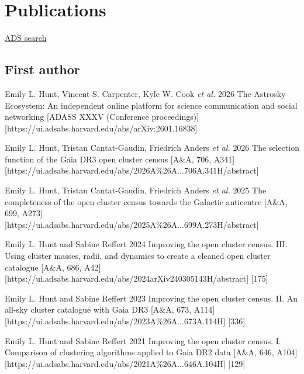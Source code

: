 \section*{Publications}

\href{\cvADSLink}{ADS search \faLink}%


\subsection*{First author}

\begin{etaremune}
    \item \publication
        {Emily L. Hunt, Vincent S. Carpenter, Kyle W. Cook \emph{et al.}}
        {2026}
        {The Astrosky Ecosystem: An independent online platform for science communication and social networking}
        [ADASS XXXV (Conference proceedings)]
        [https://ui.adsabs.harvard.edu/abs/arXiv:2601.16838]
    \item \publication
        {Emily L. Hunt, Tristan Cantat-Gaudin, Friedrich Anders \emph{et al.}}
        {2026}
        {The selection function of the Gaia DR3 open cluster census}
        [A\&A, 706, A341]
        [https://ui.adsabs.harvard.edu/abs/2026A\%26A...706A.341H/abstract]
    \item \publication
        {Emily L. Hunt, Tristan Cantat-Gaudin, Friedrich Anders \emph{et al.}}
        {2025}
        {The completeness of the open cluster census towards the Galactic anticentre}
        [A\&A, 699, A273]
        [https://ui.adsabs.harvard.edu/abs/2025A\%26A...699A.273H/abstract]
    \item \publication
        {Emily L. Hunt and Sabine Reffert}
        {2024}
        {Improving the open cluster census. III. Using cluster masses, radii, and dynamics to create a cleaned open cluster catalogue}
        [A\&A, 686, A42]
        [https://ui.adsabs.harvard.edu/abs/2024arXiv240305143H/abstract]
        [175]
    \item \publication
        {Emily L. Hunt and Sabine Reffert}
        {2023}
        {Improving the open cluster census. II. An all-sky cluster catalogue with Gaia DR3}
        [A\&A, 673, A114]
        [https://ui.adsabs.harvard.edu/abs/2023A\%26A...673A.114H]
        [336]
    \item \publication
        {Emily L. Hunt and Sabine Reffert}
        {2021}
        {Improving the open cluster census. I. Comparison of clustering algorithms applied to Gaia DR2 data}
        [A\&A, 646, A104]
        [https://ui.adsabs.harvard.edu/abs/2021A\%26A...646A.104H]
        [129]
\end{etaremune}



